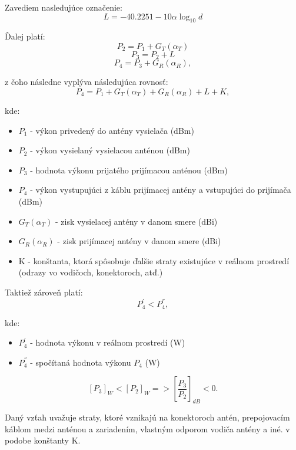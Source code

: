 \documentclass[11pt,twoside,a4paper]{book}
\begin{document}
Zavediem nasledujúce označenie:
$$L = -40.2251 - 10\alpha\log_{10}d$$

Ďalej platí:
\[
P_{2} = P_{1} + G_{T}(\alpha_{T}) \]
\[
P_{3} = P_{2} + L \]
\[
P_{4} = P_{3} + G_{R}(\alpha_{R}), \]

z čoho následne vyplýva následujúca rovnosť:
$$
P_{4} = P_{1} + G_{T}(\alpha_{T}) + G_{R}(\alpha_{R}) + L + K,
$$

kde:
\begin{itemize}
 \item $P_{1}$ - výkon privedený do antény vysielača (dBm)
 \item $P_{2}$ - výkon vysielaný vysielacou anténou (dBm)
 \item $P_{3}$ - hodnota výkonu prijatého prijímacou anténou (dBm)
 \item $P_{4}$ - výkon vystupujúci z káblu prijímacej antény a vstupujúci do prijímača (dBm)
 \item $G_{T}(\alpha_{T})$ - zisk vysielacej antény v danom smere (dBi)
 \item $G_{R}(\alpha_{R})$ - zisk prijímacej antény v danom smere (dBi)
 \item K - konštanta, ktorá spôsobuje ďalšie straty existujúce v reálnom prostredí (odrazy vo vodičoch, konektoroch, atď.)
\end{itemize}

Taktiež zároveň platí:
$$
P_{4}^{'} < P_{4}^{''},
$$

kde:
\begin{itemize}
 \item $P_{4}^{'}$ - hodnota výkonu v reálnom prostredí (W) 
 \item $P_{4}^{''}$ - spočítaná hodnota výkonu $P_{4}$ (W)
\end{itemize}

$$
\left[P_{3}\right]_{W} < \left[P_{2}\right]_{W} => \left[\frac{P_{3}}{P_{2}}\right]_{dB} < 0.
$$

Daný vzťah uvažuje straty, ktoré vznikajú na konektoroch antén, prepojovacím káblom medzi anténou a zariadením, vlastným odporom vodiča antény a iné. v podobe konštanty K.

\end{document}
